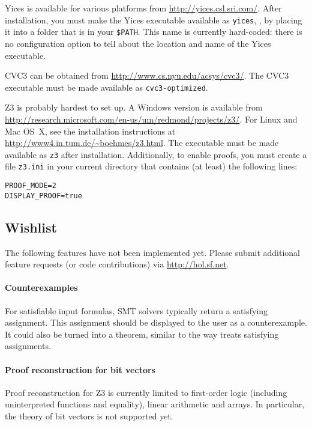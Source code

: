 Yices is available for various platforms from
\url{http://yices.csl.sri.com/}.  After installation, you must make
the Yices executable available as {\tt yices}, \eg, by placing it into
a folder that is in your {\tt \$PATH}.  This name is currently
hard-coded: there is no configuration option to tell \HOL{} about the
location and name of the Yices executable.

CVC3 can be obtained from \url{http://www.cs.nyu.edu/acsys/cvc3/}.
The CVC3 executable must be made available as {\tt cvc3-optimized}.

Z3 is probably hardest to set up.  A Windows version is available from
\url{http://research.microsoft.com/en-us/um/redmond/projects/z3/}.
For Linux and Mac OS~X, see the installation instructions at
\url{http://www4.in.tum.de/~boehmes/z3.html}.  The executable must be
made available as {\tt z3} after installation.  Additionally, to
enable proofs, you must create a file {\tt z3.ini} in your current
directory that contains (at least) the following lines:
\begin{verbatim}
PROOF_MODE=2
DISPLAY_PROOF=true
\end{verbatim}

\subsection{Wishlist}

The following features have not been implemented yet.  Please submit
additional feature requests (or code contributions) via
\url{http://hol.sf.net}.

\paragraph{Counterexamples}

For satisfiable input formulas, SMT solvers typically return a
satisfying assignment.  This assignment should be displayed to the
\HOL{} user as a counterexample.  It could also be turned into a
theorem, similar to the way  treats satisfying
assignments.

\paragraph{Proof reconstruction for bit vectors}

Proof reconstruction for Z3 is currently limited to first-order logic
(including uninterpreted functions and equality), linear arithmetic
and arrays.  In particular, the theory of bit vectors is not supported
yet.

